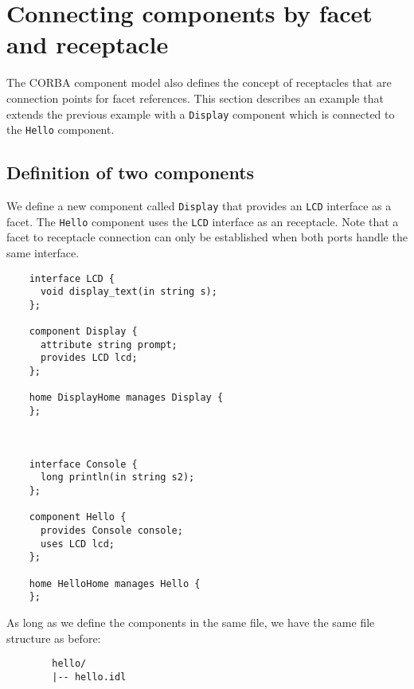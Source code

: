 \section{Connecting components by facet and receptacle}

The CORBA component model also defines the concept of receptacles that are
connection points for facet references. This section describes an example that
extends the previous example with a {\tt Display} component which is connected
to the {\tt Hello} component.


\subsection{Definition of two components}

We define a new component called {\tt Display} that provides an {\tt LCD}
interface as a facet. The {\tt Hello} component uses the {\tt LCD} interface as
an receptacle. Note that a facet to receptacle connection can only be
established when both ports handle the same interface.

\begin{verbatim}
    interface LCD {
      void display_text(in string s);
    };

    component Display {
      attribute string prompt;
      provides LCD lcd;
    };

    home DisplayHome manages Display {
    };



    interface Console {
      long println(in string s2);
    };

    component Hello {
      provides Console console;
      uses LCD lcd;
    };

    home HelloHome manages Hello {
    };
\end{verbatim}

\noindent
As long as we define the components in the same file, we have the same file
structure as before:
\begin{verbatim}
        hello/
        |-- hello.idl
\end{verbatim}

